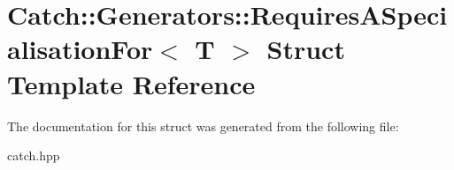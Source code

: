 \hypertarget{struct_catch_1_1_generators_1_1_requires_a_specialisation_for}{}\section{Catch\+:\+:Generators\+:\+:Requires\+A\+Specialisation\+For$<$ T $>$ Struct Template Reference}
\label{struct_catch_1_1_generators_1_1_requires_a_specialisation_for}


The documentation for this struct was generated from the following file\+:\begin{DoxyCompactItemize}
\item 
catch.\+hpp\end{DoxyCompactItemize}
